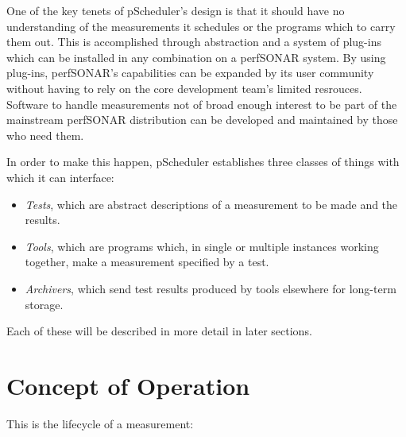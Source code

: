 \documentclass[10pt,titlepage]{article}
\begin{document}
One of the key tenets of pScheduler's design is that it should have no
understanding of the measurements it schedules or the programs which
to carry them out.  This is accomplished through abstraction and a
system of plug-ins which can be installed in any combination on a
perfSONAR system.  By using plug-ins, perfSONAR's capabilities can be
expanded by its user community without having to rely on the core
development team's limited resrouces.  Software to handle measurements
not of broad enough interest to be part of the mainstream perfSONAR
distribution can be developed and maintained by those who need them.

In order to make this happen, pScheduler establishes three classes of
things with which it can interface:

\begin{itemize}
\item {\it Tests}, which are abstract descriptions of a measurement to
  be made and the results.
\item {\it Tools}, which are programs which, in single or multiple
  instances working together, make a measurement specified by a test.
\item {\it Archivers}, which send test results produced by tools
  elsewhere for long-term storage.
\end{itemize}

Each of these will be described in more detail in later sections.

\section{Concept of Operation}


This is the lifecycle of a measurement:
\end{document}
